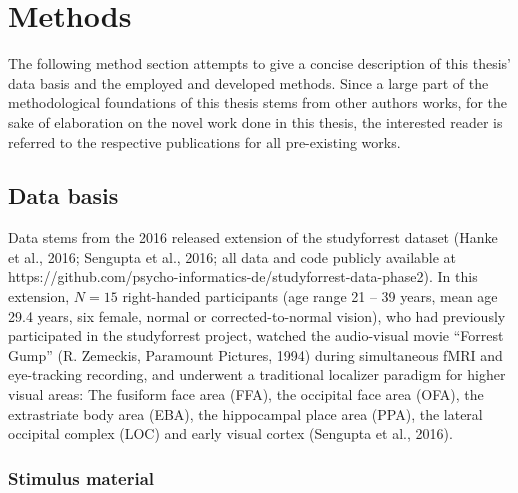 \documentclass[a4paper, 11pt]{scrreprt}
\begin{document}
\clearpage





\chapter{Methods}\label{par:methods}

The following method section attempts to give a concise description of this thesis' data basis and the employed and developed methods. Since a large part of the methodological foundations of this thesis stems from other authors works, for the sake of elaboration on the novel work done in this thesis, the interested reader is referred to the respective publications for all pre-existing works.  

\section{Data basis}

Data stems from the 2016 released extension of the studyforrest dataset (Hanke et al., 2016; Sengupta et al., 2016; all data and code publicly available at https://github.com/psycho-informatics-de/studyforrest-data-phase2). In this extension, $N = 15$ right-handed participants (age range 21 – 39 years, mean age 29.4 years, six female, normal or corrected-to-normal vision), who had previously participated in the studyforrest project, watched the audio-visual movie “Forrest Gump” (R. Zemeckis, Paramount Pictures, 1994) during simultaneous fMRI and eye-tracking recording, and underwent a traditional localizer paradigm for higher visual areas: The fusiform face area (FFA), the occipital face area (OFA), the extrastriate body area (EBA), the hippocampal place area (PPA), the lateral occipital complex (LOC) and early visual cortex (Sengupta et al., 2016).

\subsection{Stimulus material}
\end{document}
